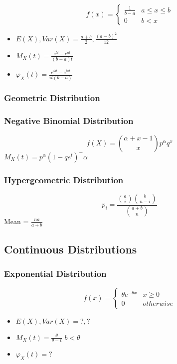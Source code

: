 \documentclass[12pt]{article}
\begin{document}
\begin{equation}
f(x)=
 \begin{cases} 
      \frac{1}{b-a} & a\leq x \leq b \\
      0 & b < x
   \end{cases}
\end{equation}

\begin{itemize}
    \item $E(X), Var(X) = \frac{a+b}{2}, \frac{(a-b)^2}{12}$
    \item $M_X(t)= \frac{e^{bt}-e^{at}}{(b-a)t}$
    \item $\varphi_X(t) = \frac{e^{ibt}-e^{iat}}{it(b-a)}$
\end{itemize}


\subsubsection{Geometric Distribution}

\subsubsection{Negative Binomial Distribution}
\[ f(X) = \binom{\alpha+x-1}{x}p^\alpha q^x \]
$M_X(t) = p^\alpha (1 - q e^t)^-\alpha$
\subsubsection{Hypergeometric Distribution}
\[ p_i = \frac{\binom{a}{i}\binom{b}{n-i}}{\binom{a+b}{n}} \]
Mean = $\frac{na}{a+b}$

\subsection{Continuous Distributions}

\subsubsection{Exponential Distribution}
\begin{equation}
f(x)=
 \begin{cases} 
      \theta e^{-\theta x} & x\geq 0 \\
      0 & otherwise
   \end{cases}
\end{equation}

\begin{itemize}
    \item $E(X), Var(X) = ?, ?$
    \item $M_X(t) = \frac{\theta}{\theta -t}$ \quad $b < \theta$
    \item $\varphi_X(t) = ?$
\end{itemize}
\end{document}

